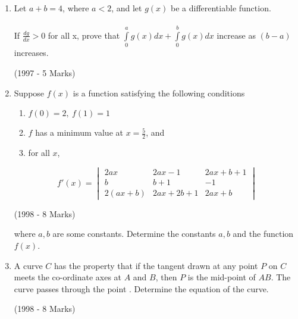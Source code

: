 \documentclass[journal,12pt,twocolumn]{IEEEtran}
\theoremstyle{remark}
\begin{document}
\begin{enumerate}
\item Let $a + b = 4$, where $a<2$, and let $g(x)$ be a differentiable function.\\\\
If $\frac{dg}{dx}>0$ for all x, prove that $\int\limits_0^a g(x) dx + \int\limits_0^b g(x) dx$ increase as $(b-a)$ increases.

\hfill (1997 - 5 Marks)


\item Suppose $f(x)$ is a function satisfying the following conditions\\
\begin{enumerate}[label = (\alph*)]
\item $f(0) = 2,\ f(1) = 1$
\item $f$ has a minimum value at $x = \frac{5}{2}$, and
\item for all $x$,
\end{enumerate}
$$f'(x)=
\begin{vmatrix}
2ax & 2ax-1 & 2ax+b+1\\
b & b+1 & -1\\
2(ax+b) & 2ax+2b+1 & 2ax+b
\end{vmatrix}$$

\hfill (1998 - 8 Marks)

where $a, b$ are some constants. Determine the constants $a, b$ and the function $f(x)$.

\item A curve $C$ has the property that if the tangent drawn at any point $P$ on $C$ meets the co-ordinate axes at $A$ and $B$, then $P$ is the mid-point of $AB$. The curve passes through the point . Determine the equation of the curve.

\hfill (1998 - 8 Marks)

 
\end{enumerate}
\end{document}
